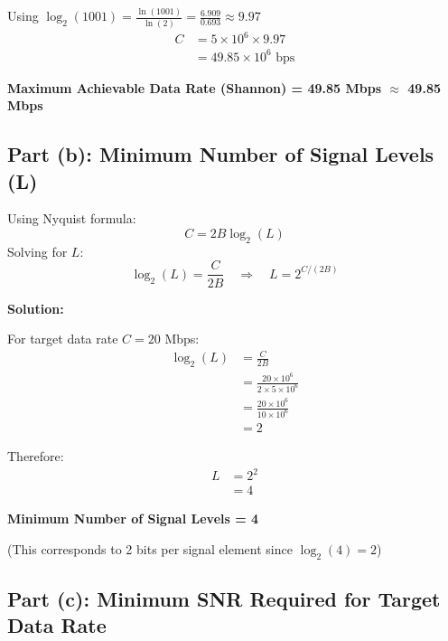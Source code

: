 \documentclass[12pt,a4paper]{article}
\begin{document}
Using $\log_2(1001) = \frac{\ln(1001)}{\ln(2)} = \frac{6.909}{0.693} \approx 9.97$
\begin{align*}
C &= 5 \times 10^6 \times 9.97 \\[1em]
&= 49.85 \times 10^6 \text{ bps}
\end{align*}

\begin{answerbox}
\textbf{Maximum Achievable Data Rate (Shannon) = 49.85 Mbps $\approx$ 49.85 Mbps}
\end{answerbox}

\subsection{Part (b): Minimum Number of Signal Levels (L)}

\begin{formulabox}
Using Nyquist formula:
\[C = 2B \log_2(L)\]
Solving for $L$:
\[\log_2(L) = \frac{C}{2B} \quad \Rightarrow \quad L = 2^{C/(2B)}\]
\end{formulabox}

\textbf{Solution:}

For target data rate $C = 20$ Mbps:
\begin{align*}
\log_2(L) &= \frac{C}{2B} \\[1em]
&= \frac{20 \times 10^6}{2 \times 5 \times 10^6} \\[1em]
&= \frac{20 \times 10^6}{10 \times 10^6} \\[1em]
&= 2
\end{align*}

Therefore:
\begin{align*}
L &= 2^2 \\[1em]
&= 4
\end{align*}

\begin{answerbox}
\textbf{Minimum Number of Signal Levels = 4}

(This corresponds to 2 bits per signal element since $\log_2(4) = 2$)
\end{answerbox}

\subsection{Part (c): Minimum SNR Required for Target Data Rate}
\end{document}
